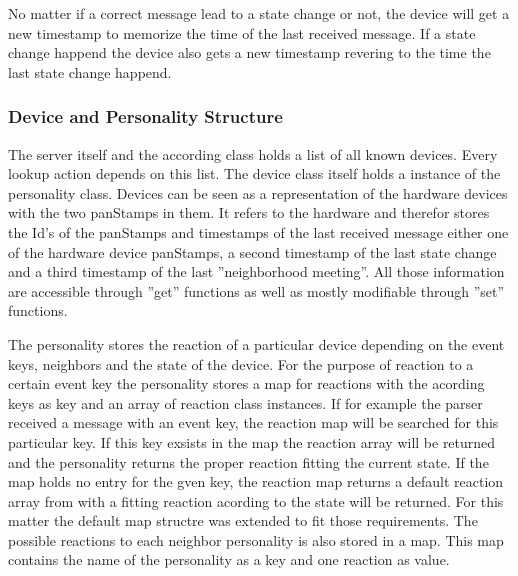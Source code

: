 No matter if a correct message lead to a state change or not, the device will
get a new timestamp to memorize the time of the last received message. If a
state change happend the device also gets a new timestamp revering to the time
the last state change happend.

\subsubsection{Device and Personality Structure}
The server itself and the according class holds a list of all known devices. Every lookup action depends on this list. The device class itself holds a instance of the personality class.
Devices can be seen as a representation of the hardware devices with the two panStamps in them. It refers to the hardware and therefor stores the Id's of the panStamps and timestamps of the last received message either one of the hardware device panStamps, a second timestamp of the last state change and a third timestamp of the last ''neighborhood meeting''. All those information are accessible through ''get'' functions as well as mostly modifiable through ''set'' functions.

The personality stores the reaction of a particular device depending on the
event keys, neighbors and the state of the device. For the purpose of reaction
to a certain event key the personality stores
a map for reactions with the acording keys as key and an array of reaction class
instances. If for example the parser received a message with an event key, the
reaction map will be searched for this particular key. If this key exsists in
the map the reaction array will be returned and the personality returns the
proper reaction fitting the current state. If the map holds no entry for the
gven key, the reaction map returns a default reaction array from with a fitting
reaction acording to the state will be returned. For this matter the default
map structre was extended to fit those requirements.
The possible reactions to each neighbor personality is also stored in a map. This
map contains the name of the personality as a key and one reaction as value. 


